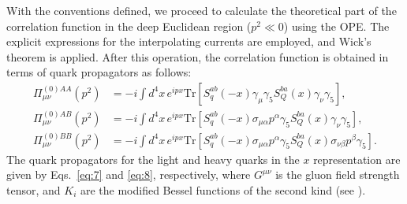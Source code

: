 \documentclass[prd,a4paper,preprint,preprintnumbers,nofootinbib,superscriptaddress]{revtex4-2}
\begin{document}
With the conventions defined, we proceed to calculate the theoretical part of the correlation function in the deep Euclidean region (\( p^2 \ll 0 \)) using the OPE. The explicit expressions for the interpolating currents are employed, and Wick's theorem is applied.  After this operation, the correlation function is obtained in terms of quark propagators as follows:
%
\begin{equation}
  \label{eq:7}
  \begin{aligned}
    \Pi_{\mu \nu}^{(0)AA} (p^2) &= -i \int d^4x \, e^{i p x } \mathrm{Tr} \left[ S_q^{ab}(-x) \gamma_\mu \gamma_5 S_Q^{ba}(x) \gamma_\nu \gamma_5 \right], \\
    \Pi_{\mu \nu}^{(0)AB} (p^2) &= -i \int d^4x \, e^{i p x } \mathrm{Tr} \left[ S_q^{ab}(-x) \sigma_{\mu \alpha} p^\alpha \gamma_5 S_Q^{ba}(x) \gamma_\nu \gamma_5 \right], \\
    \Pi_{\mu \nu}^{(0)BB} (p^2) &= -i \int d^4x \, e^{i p x } \mathrm{Tr} \left[ S_q^{ab}(-x) \sigma_{\mu \alpha} p^\alpha \gamma_5 S_Q^{ba}(x) \sigma_{\nu \beta} p^\beta \gamma_5 \right].
  \end{aligned}
\end{equation}
%
%
%
The quark propagators for the light and heavy quarks in the  \(x\) representation are given by Eqs.~\eqref{eq:7} and \eqref{eq:8}, respectively, where \(G^{\mu\nu}\) is the gluon field strength tensor, and \(K_i\) are the modified Bessel functions of the second kind (see \cite{Huang:2012ti, ParticleDataGroup:2022pth}).
\end{document}
